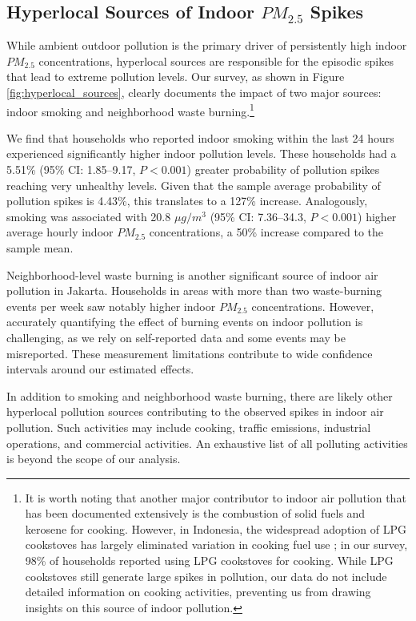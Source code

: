\documentclass[reqno,12pt,notitlepage]{article}
\begin{document}
\subsection{Hyperlocal Sources of Indoor $PM_{2.5}$ Spikes}
While ambient outdoor pollution is the primary driver of persistently high indoor $PM_{2.5}$ concentrations, hyperlocal sources are responsible for the episodic spikes that lead to extreme pollution levels. Our survey, as shown in Figure \ref{fig:hyperlocal_sources}, clearly documents the impact of two major sources: indoor smoking and neighborhood waste burning.\footnote{It is worth noting that another major contributor to indoor air pollution that has been documented extensively is the combustion of solid fuels and kerosene for cooking. However, in Indonesia, the widespread adoption of LPG cookstoves has largely eliminated variation in cooking fuel use \citep{astuti_successful_2019}; in our survey, 98\% of households reported using LPG cookstoves for cooking. While LPG cookstoves still generate large spikes in pollution, our data do not include detailed information on cooking activities, preventing us from drawing insights on this source of indoor pollution.}

We find that households who reported indoor smoking within the last 24 hours experienced significantly higher indoor pollution levels. These households had a 5.51\% (95\% CI: 1.85–9.17, $P < 0.001$) greater probability of pollution spikes reaching very unhealthy levels. Given that the sample average probability of pollution spikes is 4.43\%, this translates to a 127\% increase. Analogously, smoking was associated with 20.8 $\mu g/m^3$ (95\% CI: 7.36–34.3, $P < 0.001$) higher average hourly indoor $PM_{2.5}$ concentrations, a 50\% increase compared to the sample mean.

Neighborhood-level waste burning is another significant source of indoor air pollution in Jakarta. Households in areas with more than two waste-burning events per week saw notably higher indoor $PM_{2.5}$ concentrations. However, accurately quantifying the effect of burning events on indoor pollution is challenging, as we rely on self-reported data and some events may be misreported. These measurement limitations contribute to wide confidence intervals around our estimated effects.

In addition to smoking and neighborhood waste burning, there are likely other hyperlocal pollution sources contributing to the observed spikes in indoor air pollution. Such activities may include cooking, traffic emissions, industrial operations, and commercial activities. An exhaustive list of all polluting activities is beyond the scope of our analysis.
\end{document}
